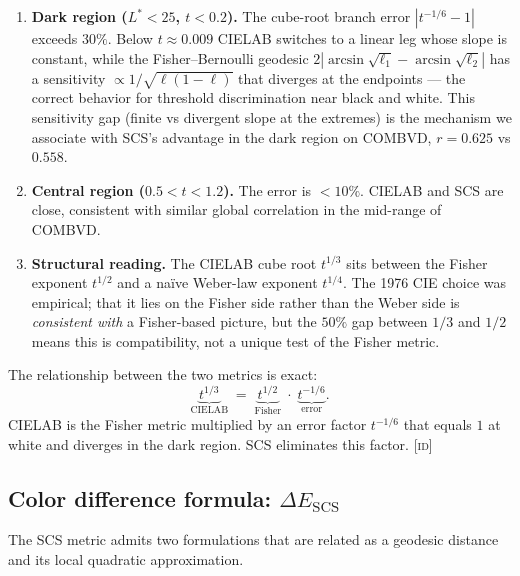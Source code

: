 \documentclass[12pt,a4paper]{article}
\begin{document}
\begin{enumerate}[nosep]
\item \textbf{Dark region ($L^* < 25$, $t < 0.2$).} The cube-root
  branch error $|t^{-1/6} - 1|$ exceeds $30\%$. Below $t \approx 0.009$
  CIELAB switches to a linear leg whose slope is constant, while the
  Fisher--Bernoulli geodesic
  $2|\arcsin\sqrt{\ell_1} - \arcsin\sqrt{\ell_2}|$ has a sensitivity
  $\propto 1/\sqrt{\ell(1-\ell)}$ that diverges at the endpoints ---
  the correct behavior for threshold discrimination near black and
  white. This sensitivity gap (finite vs divergent slope at the
  extremes) is the mechanism we associate with SCS's advantage in the
  dark region on COMBVD, $r = 0.625$ vs $0.558$.

\item \textbf{Central region ($0.5 < t < 1.2$).} The error is $< 10\%$.
  CIELAB and SCS are close, consistent with similar global correlation
  in the mid-range of COMBVD.

\item \textbf{Structural reading.} The CIELAB cube root $t^{1/3}$ sits
  between the Fisher exponent $t^{1/2}$ and a naïve Weber-law exponent
  $t^{1/4}$. The 1976 CIE choice was empirical; that it lies on the
  Fisher side rather than the Weber side is \emph{consistent with} a
  Fisher-based picture, but the $50\%$ gap between $1/3$ and $1/2$ means
  this is compatibility, not a unique test of the Fisher metric.
\end{enumerate}

\begin{identitybox}
The relationship between the two metrics is exact:
\[
  \underbrace{t^{1/3}}_{\text{CIELAB}} \;=\;
  \underbrace{t^{1/2}}_{\text{Fisher}} \;\cdot\;
  \underbrace{t^{-1/6}}_{\text{error}}.
\]
CIELAB is the Fisher metric multiplied by an error factor $t^{-1/6}$
that equals $1$ at white and diverges in the dark region. SCS
eliminates this factor. \textsc{[id]}
\end{identitybox}

\subsection{Color difference formula: $\Delta E_{\mathrm{SCS}}$}

The SCS metric admits two formulations that are related as a geodesic
distance and its local quadratic approximation.
\end{document}
